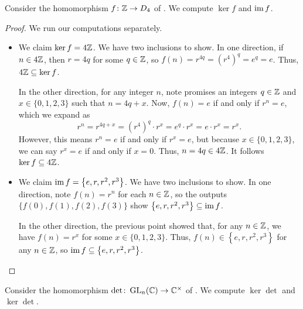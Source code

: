 \documentclass[../notes.tex]{subfiles}
\begin{document}
\begin{example} \label{ex:z-to-d4-ker-im}
    Consider the homomorphism $f\colon\mathbb Z\to D_4$ of . We compute $\ker f$ and $\operatorname{im} f$.
\end{example}
\begin{proof}
    We run our computations separately.
    \begin{itemize}
        \item We claim $\ker f=4\mathbb Z$. We have two inclusions to show. In one direction, if $n\in4\mathbb Z$, then $r=4q$ for some $q\in\mathbb Z$, so $f(n)=r^{4q}=\left(r^4\right)^q=e^q=e$. Thus, $4\mathbb Z\subseteq\ker f$.
        
        In the other direction, for any integer $n$, note  promises an integers $q\in\mathbb Z$ and $x\in\{0,1,2,3\}$ such that $n=4q+x$. Now, $f(n)=e$ if and only if $r^n=e$, which we expand as
        \[r^n=r^{4q+x}=\left(r^4\right)^q\cdot r^x=e^q\cdot r^x=e\cdot r^x=r^x.\]
        However, this means $r^n=e$ if and only if $r^x=e$, but because $x\in\{0,1,2,3\}$, we can say $r^x=e$ if and only if $x=0$. Thus, $n=4q\in4\mathbb Z$. It follows $\ker f\subseteq4\mathbb Z$.
        
        \item We claim $\operatorname{im} f=\left\{e,r,r^2,r^3\right\}$. We have two inclusions to show. In one direction, note $f(n)=r^n$ for each $n\in\mathbb Z$, so the outputs $\{f(0),f(1),f(2),f(3)\}$ show $\left\{e,r,r^2,r^3\right\}\subseteq\operatorname{im} f$.
        
        In the other direction, the previous point showed that, for any $n\in\mathbb Z$, we have $f(n)=r^x$ for some $x\in\{0,1,2,3\}$. Thus, $f(n)\in\left\{e,r,r^2,r^3\right\}$ for any $n\in\mathbb Z$, so $\operatorname{im} f\subseteq\left\{e,r,r^2,r^3\right\}$.
        \qedhere
    \end{itemize}
\end{proof}
\begin{example}
    Consider the homomorphism $\det\colon\operatorname{GL}_n(\mathbb C)\to\mathbb C^\times$ of . We compute $\ker\det$ and $\ker\det$.
\end{example}
\end{document}
